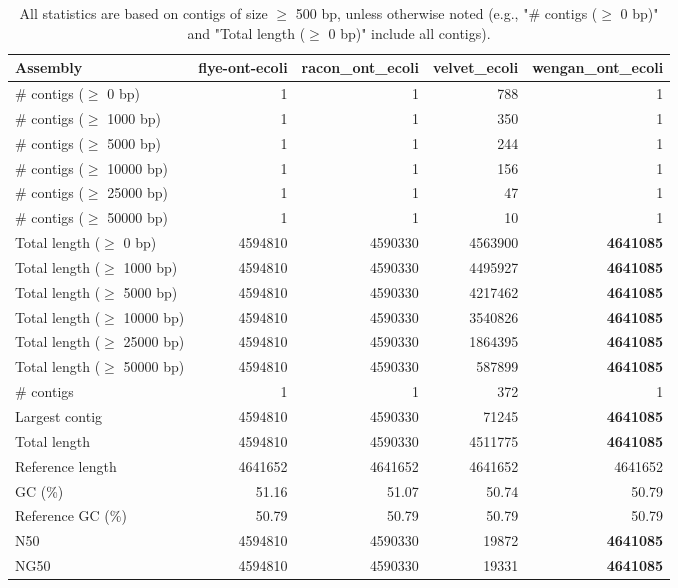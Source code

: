 \documentclass[12pt,a4paper]{article}
\begin{document}
\begin{table}[ht]
\begin{center}
\caption{All statistics are based on contigs of size $\geq$ 500 bp, unless otherwise noted (e.g., "\# contigs ($\geq$ 0 bp)" and "Total length ($\geq$ 0 bp)" include all contigs).}
\begin{tabular}{|l*{4}{|r}|}
\hline
Assembly & flye-ont-ecoli & racon\_ont\_ecoli & velvet\_ecoli & wengan\_ont\_ecoli \\ \hline
\# contigs ($\geq$ 0 bp) & 1 & 1 & 788 & 1 \\ \hline
\# contigs ($\geq$ 1000 bp) & 1 & 1 & 350 & 1 \\ \hline
\# contigs ($\geq$ 5000 bp) & 1 & 1 & 244 & 1 \\ \hline
\# contigs ($\geq$ 10000 bp) & 1 & 1 & 156 & 1 \\ \hline
\# contigs ($\geq$ 25000 bp) & 1 & 1 & 47 & 1 \\ \hline
\# contigs ($\geq$ 50000 bp) & 1 & 1 & 10 & 1 \\ \hline
Total length ($\geq$ 0 bp) & 4594810 & 4590330 & 4563900 & {\bf 4641085} \\ \hline
Total length ($\geq$ 1000 bp) & 4594810 & 4590330 & 4495927 & {\bf 4641085} \\ \hline
Total length ($\geq$ 5000 bp) & 4594810 & 4590330 & 4217462 & {\bf 4641085} \\ \hline
Total length ($\geq$ 10000 bp) & 4594810 & 4590330 & 3540826 & {\bf 4641085} \\ \hline
Total length ($\geq$ 25000 bp) & 4594810 & 4590330 & 1864395 & {\bf 4641085} \\ \hline
Total length ($\geq$ 50000 bp) & 4594810 & 4590330 & 587899 & {\bf 4641085} \\ \hline
\# contigs & 1 & 1 & 372 & 1 \\ \hline
Largest contig & 4594810 & 4590330 & 71245 & {\bf 4641085} \\ \hline
Total length & 4594810 & 4590330 & 4511775 & {\bf 4641085} \\ \hline
Reference length & 4641652 & 4641652 & 4641652 & 4641652 \\ \hline
GC (\%) & 51.16 & 51.07 & 50.74 & 50.79 \\ \hline
Reference GC (\%) & 50.79 & 50.79 & 50.79 & 50.79 \\ \hline
N50 & 4594810 & 4590330 & 19872 & {\bf 4641085} \\ \hline
NG50 & 4594810 & 4590330 & 19331 & {\bf 4641085} \\ \hline

\end{tabular}
\end{center}
\end{table}
\end{document}
